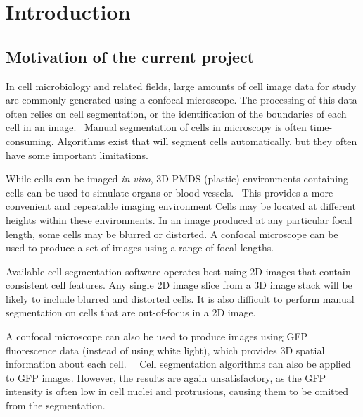 
\chapter{Introduction}  %

\ifpdf
    \graphicspath{{Chapter1/Figs/Raster/}{Chapter1/Figs/PDF/}{Chapter1/Figs/}}
\else
    \graphicspath{{Chapter1/Figs/Vector/}{Chapter1/Figs/}}
\fi

\section{Motivation of the current project} %
\label{section1.1}

In cell microbiology and related fields, large amounts of cell image data for study are commonly generated using a confocal microscope. The processing of this data often relies on cell segmentation, or the identification of the boundaries of each cell in an image.~\cite{liao} Manual segmentation of cells in microscopy is often time-consuming. Algorithms exist that will segment cells automatically, but they often have some important limitations.

While cells can be imaged \emph{in vivo}, 3D PMDS (plastic) environments containing cells can be used to simulate organs or blood vessels.~\cite{huh} This provides a more convenient and repeatable imaging environment Cells may be located at different heights within these environments. In an image produced at any particular focal length, some cells may be blurred or distorted. A confocal microscope can be used to produce a set of images using a range of focal lengths.

Available cell segmentation software operates best using 2D images that contain consistent cell features. Any single 2D image slice from a 3D image stack will be likely to include blurred and distorted cells. It is also difficult to perform manual segmentation on cells that are out-of-focus in a 2D image.

A confocal microscope can also be used to produce images using GFP fluorescence data (instead of using white light), which provides 3D spatial information about each cell.~\cite{booth}~\cite{carlsson} Cell segmentation algorithms can also be applied to GFP images. However, the results are again unsatisfactory, as the GFP intensity is often low in cell nuclei and protrusions, causing them to be omitted from the segmentation.~\cite{arce}

